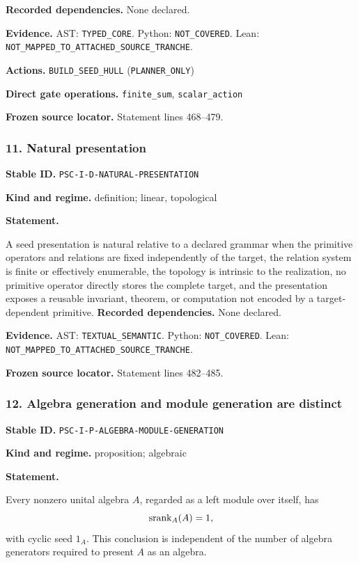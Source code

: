 \documentclass[a4paper,11pt]{article}
\newcommand{\field}[2]{\noindent\textbf{#1.} #2\par}
\begin{document}
\field{Recorded dependencies}{None declared.}
\field{Evidence}{AST: \nolinkurl{TYPED_CORE}. Python: \nolinkurl{NOT_COVERED}. Lean: \nolinkurl{NOT_MAPPED_TO_ATTACHED_SOURCE_TRANCHE}.}
\field{Actions}{\nolinkurl{BUILD_SEED_HULL} (\nolinkurl{PLANNER_ONLY})}
\field{Direct gate operations}{\nolinkurl{finite_sum}, \nolinkurl{scalar_action}}
\field{Frozen source locator}{Statement lines 468--479.}
\subsubsection*{11. Natural presentation}
\label{rec:PSC-I-D-NATURAL-PRESENTATION}
\field{Stable ID}{\nolinkurl{PSC-I-D-NATURAL-PRESENTATION}}
\field{Kind and regime}{definition; linear, topological}
\textbf{Statement.}\par
A seed presentation is natural relative to a declared grammar when the primitive operators and relations are fixed independently of the target, the relation system is finite or effectively enumerable, the topology is intrinsic to the realization, no primitive operator directly stores the complete target, and the presentation exposes a reusable invariant, theorem, or computation not encoded by a target-dependent primitive.
\field{Recorded dependencies}{None declared.}
\field{Evidence}{AST: \nolinkurl{TEXTUAL_SEMANTIC}. Python: \nolinkurl{NOT_COVERED}. Lean: \nolinkurl{NOT_MAPPED_TO_ATTACHED_SOURCE_TRANCHE}.}
\field{Frozen source locator}{Statement lines 482--485.}
\subsubsection*{12. Algebra generation and module generation are distinct}
\label{rec:PSC-I-P-ALGEBRA-MODULE-GENERATION}
\field{Stable ID}{\nolinkurl{PSC-I-P-ALGEBRA-MODULE-GENERATION}}
\field{Kind and regime}{proposition; algebraic}
\textbf{Statement.}\par
Every nonzero unital algebra $A$, regarded as a left module over itself, has
\[
\operatorname{srank}_A(A)=1,
\]
with cyclic seed $1_A$.  This conclusion is independent of the number of algebra generators required to present $A$ as an algebra.
\end{document}
